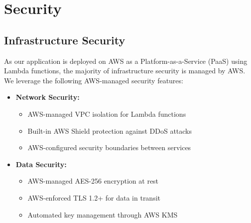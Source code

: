 \documentclass[a4paper, 11pt]{scrreprt}
\begin{document}
\section{Security}
\subsection{Infrastructure Security}
As our application is deployed on AWS as a Platform-as-a-Service (PaaS) using Lambda functions, the majority of infrastructure security is managed by AWS. We leverage the following AWS-managed security features:

\begin{itemize}
    \item \textbf{Network Security:}
    \begin{itemize}
        \item AWS-managed VPC isolation for Lambda functions
        \item Built-in AWS Shield protection against DDoS attacks
        \item AWS-configured security boundaries between services
    \end{itemize}
    
    \item \textbf{Data Security:}
    \begin{itemize}
        \item AWS-managed AES-256 encryption at rest
        \item AWS-enforced TLS 1.2+ for data in transit
        \item Automated key management through AWS KMS
    \end{itemize}
\end{itemize}
\end{document}
